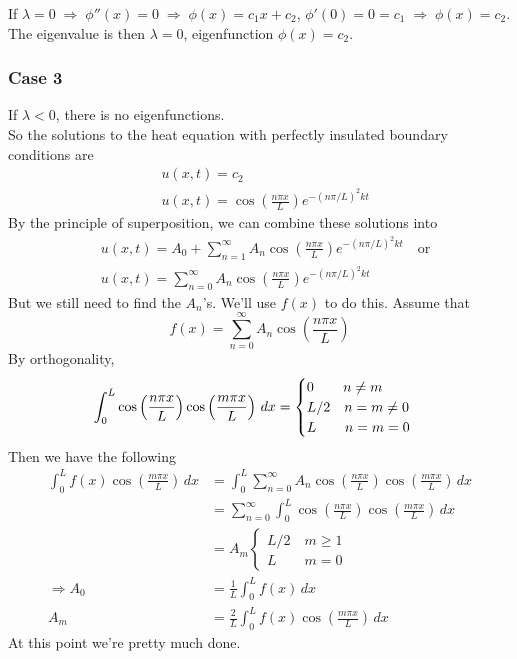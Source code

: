 \documentclass{article}
\begin{document}
\begin{eg}
	If $ \lambda = 0 \; \Rightarrow \; \phi''(x) = 0 \; \Rightarrow \; \phi(x) = c_1x + c_2 $, $ \phi'(0) = 0 = c_1 \; \Rightarrow \; \phi(x) = c_2 $. The eigenvalue is then $ \lambda = 0 $, eigenfunction $ \phi(x) = c_2 $.
	
	\subsubsection*{Case 3}
	
	If $ \lambda < 0 $, there is no eigenfunctions. \\ 
	
	So the solutions to the heat equation with perfectly insulated boundary conditions are
	\begin{align*}
		&u(x,t) = c_2 \\
		&u(x,t) = \cos\left( \frac{n\pi x}{L} \right) e^{-(n\pi/L)^2 kt}
	\end{align*}
	By the principle of superposition, we can combine these solutions into 
	\begin{align*}
		&u(x,t) = A_0 + \sum\limits_{n=1}^{\infty} A_n \cos\left( \frac{n\pi x}{L} \right) e^{-(n\pi/L)^2 kt} \quad  \text{or} \\
		&u(x,t) = \sum\limits_{n=0}^{\infty} A_n \cos\left( \frac{n\pi x}{L} \right) e^{-(n\pi/L)^2 kt}
	\end{align*}
	But we still need to find the $ A_n $'s. We'll use $ f(x) $ to do this. Assume that 
	\[
		f(x) = \sum\limits_{n=0}^{\infty} A_n \cos\left( \frac{n\pi x}{L} \right)
	\]
	By orthogonality,
	\[
		\int_0^L \cos\left( \frac{n\pi x}{L} \right) \cos\left( \frac{m\pi x}{L} \right) \, dx =
			\begin{cases}
				0 \hspace{0.74cm} n \neq m\\
				L/2 \quad n = m \neq 0 \\
				L \hspace{0.72cm} n = m = 0
			\end{cases}
	\]
	Then we have the following
	\begin{align*}
		\int_0^L f(x) \cos\left( \frac{m\pi x}{L} \right) \, dx &= \int_0^L \sum\limits_{n=0}^{\infty} A_n \cos\left( \frac{n\pi x}{L} \right) \cos\left( \frac{m\pi x}{L} \right) \, dx \\
		&= \sum\limits_{n=0}^{\infty} \int_0^L \cos\left( \frac{n\pi x}{L} \right) \cos\left( \frac{m\pi x}{L} \right) \, dx \\
		&= A_m
			\begin{cases}
				L/2 \quad m \geq 1\\
				L \quad \quad  m = 0
			\end{cases}
		\\
		\Rightarrow A_0 &= \frac{1}{L} \int_0^L f(x) \, dx \\
		A_m &= \frac{2}{L} \int_0^L f(x) \cos\left( \frac{m\pi x}{L} \right) \, dx
	\end{align*}
	At this point we're pretty much done.
	\end{eg}
	
\end{document}

